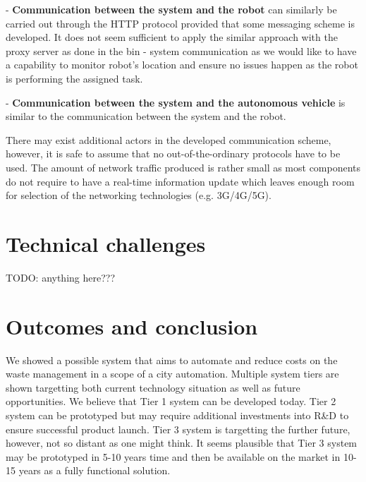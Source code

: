 \documentclass{article}
\begin{document}
- \textbf{Communication between the system and the robot} can similarly be carried out through the
HTTP protocol provided that some messaging scheme is developed. It does not seem sufficient to apply
the similar approach with the proxy server as done in the bin - system communication as we would
like to have a capability to monitor robot's location and ensure no issues happen as the robot is
performing the assigned task.

- \textbf{Communication between the system and the autonomous vehicle} is similar to the
communication between the system and the robot.

There may exist additional actors in the developed communication scheme, however, it is safe to
assume that no out-of-the-ordinary protocols have to be used. The amount of network traffic produced
is rather small as most components do not require to have a real-time information update which
leaves enough room for selection of the networking technologies (e.g. 3G/4G/5G).

\section{Technical challenges}
TODO: anything here???

\section{Outcomes and conclusion}

We showed a possible system that aims to automate and reduce costs on the waste management in a
scope of a city automation. Multiple system tiers are shown targetting both current technology
situation as well as future opportunities. We believe that Tier 1 system can be developed today.
Tier 2 system can be prototyped but may require additional investments into R\&D to ensure
successful product launch. Tier 3 system is targetting the further future, however, not so distant
as one might think. It seems plausible that Tier 3 system may be prototyped in 5-10 years time and
then be available on the market in 10-15 years as a fully functional solution.
\end{document}
